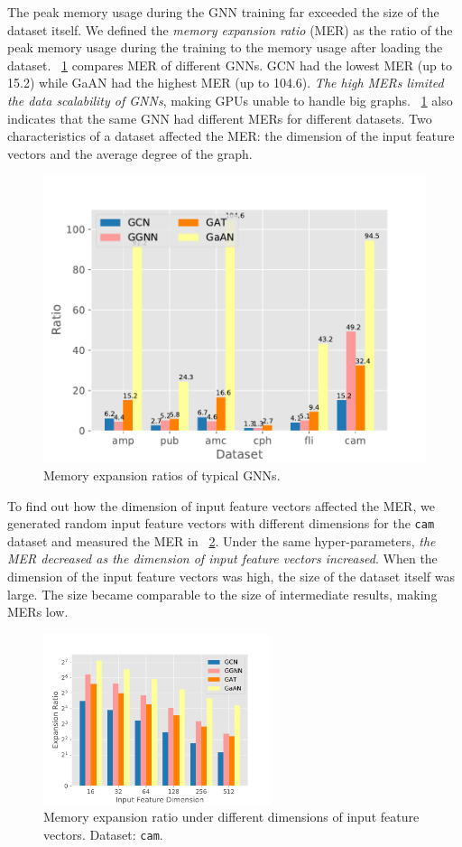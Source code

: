 The peak memory usage during the GNN training far exceeded the size of the dataset itself.
%
We defined the \emph{memory expansion ratio} (MER) as the ratio of the peak memory usage during the training to the memory usage after loading the dataset.
%
\figurename~\ref{fig:exp_memory_expansion_ratio} compares MER of different GNNs.
%
GCN had the lowest MER (up to 15.2) while GaAN had the highest MER (up to 104.6).
%
\emph{The high MERs limited the data scalability of GNNs}, making GPUs unable to handle big graphs.
%
\figurename~\ref{fig:exp_memory_expansion_ratio} also indicates that the same GNN had different MERs for different datasets.
%
Two characteristics of a dataset affected the MER: the dimension of the input feature vectors and the average degree of the graph.

\begin{figure}[H]
    \centering
    \includegraphics[width=0.5\columnwidth]{figs/experiments/exp_memory_expansion_ratio.pdf}
    \caption{Memory expansion ratios of typical GNNs.}
    \label{fig:exp_memory_expansion_ratio}
\end{figure}

To find out how the dimension of input feature vectors affected the MER, we generated random input feature vectors with different dimensions for the \texttt{cam} dataset and measured the MER in \figurename~\ref{fig:exp_memory_expension_ratio_input_feature_dimension}.
%
Under the same hyper-parameters, \emph{the MER decreased as the dimension of input feature vectors increased}.
%
When the dimension of the input feature vectors was high, the size of the dataset itself was large.
%
The size became comparable to the size of intermediate results,  making MERs low.


\begin{figure}[H]
    \centering
    \includegraphics[height=5cm]{figs/experiments/exp_memory_expansion_ratio_input_feature_dimension_com-amazon.pdf}
    \caption{Memory expansion ratio under different dimensions of input feature vectors. Dataset: \texttt{cam}.}
    \label{fig:exp_memory_expension_ratio_input_feature_dimension}
\end{figure}

